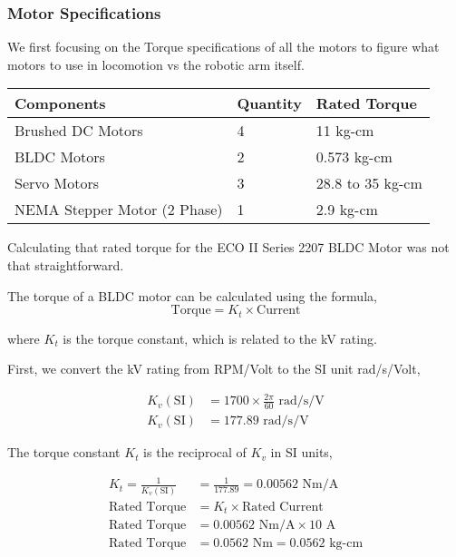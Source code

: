 \documentclass[12pt]{article}
\begin{document}
\subsubsection*{Motor Specifications}
We first focusing on the Torque specifications of all the motors to figure what motors to use in locomotion vs the robotic arm itself.
\begin{table}[h]
\centering
\begin{tabular}{lll}
\toprule
\textbf{Components} & \textbf{Quantity} & \textbf{Rated Torque} \\
\midrule
Brushed DC Motors & 4 & 11 kg-cm \\
BLDC Motors & 2 & 0.573 kg-cm \\
Servo Motors & 3 & 28.8 to 35 kg-cm \\
NEMA Stepper Motor (2 Phase) & 1 & 2.9 kg-cm \\
\bottomrule
\end{tabular}
\end{table}
\FloatBarrier

Calculating that rated torque for the ECO II Series 2207 BLDC Motor was not that straightforward.

The torque of a BLDC motor can be calculated using the formula,
\begin{equation*}
\text{Torque} = K_t \times \text{Current}
\end{equation*}

where $K_t$ is the torque constant, which is related to the kV rating.

First, we convert the kV rating from RPM/Volt to the SI unit rad/s/Volt,

\begin{align*}
K_v(\text{SI}) &= 1700 \times \frac{2\pi}{60} \text{ rad/s/V} \\
K_v(\text{SI}) &= 177.89 \text{ rad/s/V}
\end{align*}

The torque constant $K_t$ is the reciprocal of $K_v$ in SI units,

\begin{align*}
K_t = \frac{1}{K_v(\text{SI})} &= \frac{1}{177.89} = 0.00562 \text{ Nm/A}\\
\text{Rated Torque} &= K_t \times \text{Rated Current} \\
\text{Rated Torque} &= 0.00562 \text{ Nm/A} \times 10 \text{ A} \\
\text{Rated Torque} &= 0.0562 \text{ Nm} = 0.0562 \text{ kg-cm}
\end{align*}
\end{document}
